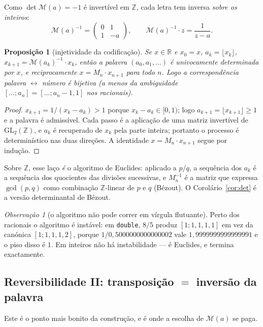 \documentclass[11pt,a4paper]{article}
\theoremstyle{plain}
\newtheorem{proposicao}[teorema]{Proposição}
\theoremstyle{definition}
\theoremstyle{remark}
\newtheorem{obs}[teorema]{Observação}
\newcommand{\R}{\mathbb{R}}
\newcommand{\Z}{\mathbb{Z}}
\newcommand{\Mat}[1]{\mathcal{M}(#1)}
\newcommand{\GL}{\mathrm{GL}}
\newcommand{\cf}[2]{[#1;#2]}
\begin{document}
Como $\det\Mat{a} = -1$ é invertível em $\Z$, cada letra tem inversa \emph{sobre os inteiros}:
\[
  \Mat{a}^{-1} = \begin{pmatrix} 0 & 1 \\ 1 & -a \end{pmatrix},
  \qquad \Mat{a}^{-1}\cdot z = \frac{1}{z-a}.
\]

\begin{proposicao}[injetividade da codificação]
Se $x \in \R$ e $x_0 = x$, $a_k = \lfloor x_k \rfloor$, $x_{k+1} = \Mat{a_k}^{-1}\cdot x_k$,
então a palavra $(a_0,a_1,\dots)$ é univocamente determinada por $x$, e reciprocamente
$x = M_n \cdot x_{n+1}$ para todo $n$. Logo a correspondência palavra $\leftrightarrow$ número
é bijetiva (a menos da ambiguidade $\cf{\dots}{a_n} = \cf{\dots}{a_n-1,1}$ nos racionais).
\end{proposicao}

\begin{proof}
$x_{k+1} = 1/(x_k - a_k) > 1$ porque $x_k - a_k \in [0,1)$; logo $a_{k+1} = \lfloor x_{k+1}\rfloor
\geq 1$ e a palavra é admissível. Cada passo é a aplicação de uma matriz invertível de
$\GL_2(\Z)$, e $a_k$ é recuperado de $x_k$ pela parte inteira; portanto o processo é
determinístico nas duas direções. A identidade $x = M_n\cdot x_{n+1}$ segue por indução.
\end{proof}

Sobre $\Z$, esse laço \emph{é} o algoritmo de Euclides: aplicado a $p/q$, a sequência dos $a_k$
é a sequência dos quocientes das divisões sucessivas, e $M_n^{-1}$ é a matriz que expressa
$\gcd(p,q)$ como combinação $\Z$-linear de $p$ e $q$ (Bézout). O Corolário~\ref{cor:det} é
a versão determinantal de Bézout.

\begin{obs}[o algoritmo não pode correr em vírgula flutuante]\label{obs:float}
Perto dos racionais o algoritmo é instável: em \texttt{double}, $8/5$ produz $\cf{1}{1,1,1,1}$ em vez
da canónica $\cf{1}{1,1,1,2}$, porque $1/0{,}5000000000000002$ vale $1{,}9999999999999991$ e o piso
disso é $1$. Em inteiros não há instabilidade --- é Euclides, e termina exactamente.
\end{obs}

\subsection{Reversibilidade II: transposição \texorpdfstring{$=$}{=} inversão da palavra}\label{sec:revII}

Este é o ponto mais bonito da construção, e é onde a escolha de $\Mat{a}$ se paga.
\end{document}
